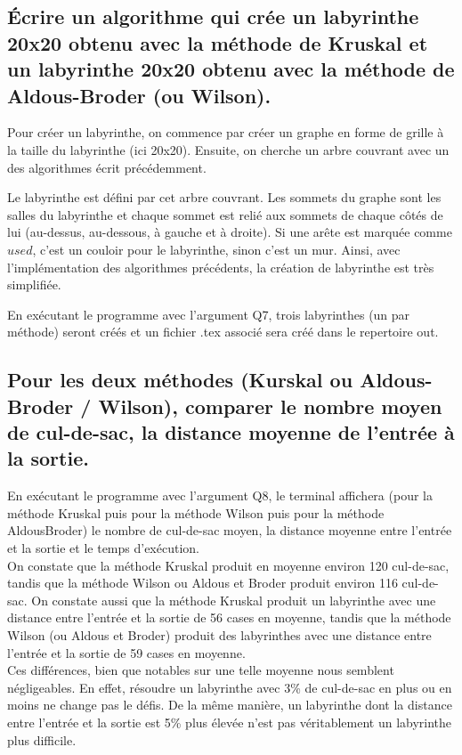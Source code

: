 \documentclass[a4paper,11pt]{article}
\begin{document}
        \subsection{Écrire un algorithme qui crée un labyrinthe 20x20 obtenu avec la méthode de Kruskal
        et un labyrinthe 20x20 obtenu avec la méthode de Aldous-Broder (ou Wilson).}\label{subsec:Q7.}
            Pour créer un labyrinthe, on commence par créer un graphe en forme de grille à la taille du labyrinthe (ici 20x20).
            Ensuite, on cherche un arbre couvrant avec un des algorithmes écrit précédemment.

            Le labyrinthe est défini par cet arbre couvrant.
            Les sommets du graphe sont les salles du labyrinthe et chaque sommet est relié aux sommets de chaque côtés de lui
            (au-dessus, au-dessous, à gauche et à droite).
            Si une arête est marquée comme $used$, c'est un couloir pour le labyrinthe, sinon c'est un mur.
            Ainsi, avec l'implémentation des algorithmes précédents, la création de labyrinthe est très simplifiée.

            En exécutant le programme avec l'argument Q7,
            trois labyrinthes (un par méthode) seront créés et un fichier .tex associé sera créé dans le repertoire out.

        \subsection{Pour les deux méthodes (Kurskal ou Aldous-Broder / Wilson),
        comparer le nombre moyen de cul-de-sac, la distance moyenne de l'entrée à la sortie.}\label{subsec:Q8}
            En exécutant le programme avec l'argument Q8,
            le terminal affichera (pour la méthode Kruskal puis pour la méthode Wilson puis pour la méthode AldousBroder)
            le nombre de cul-de-sac moyen, la distance moyenne entre l'entrée et la sortie et le temps d'exécution.\\

            On constate que la méthode Kruskal produit en moyenne environ 120 cul-de-sac,
            tandis que la méthode Wilson ou Aldous et Broder produit environ 116 cul-de-sac.
            On constate aussi que la méthode Kruskal produit un labyrinthe avec une distance
            entre l'entrée et la sortie de 56 cases en moyenne,
            tandis que la méthode Wilson (ou Aldous et Broder) produit des labyrinthes avec une distance
            entre l'entrée et la sortie de 59 cases en moyenne.\\

            Ces différences, bien que notables sur une telle moyenne nous semblent négligeables.
            En effet, résoudre un labyrinthe avec 3\% de cul-de-sac en plus ou en moins ne change pas le défis.
            De la même manière, un labyrinthe dont la distance entre l'entrée et la sortie est 5\%
            plus élevée n'est pas véritablement un labyrinthe plus difficile.
\end{document}
